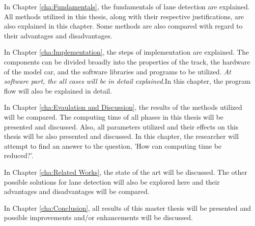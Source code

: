 In Chapter \ref{cha:Fundamentals}, the fundamentals of lane detection are explained. All methods utilized in this thesis, along with their respective justifications, are also explained in this chapter. Some methods are also compared with regard to their advantages and disadvantages.


In Chapter \ref{cha:Implementation}, the steps of implementation are explained. The components can be divided broadly into the properties of the track, the hardware of the model car, and the software libraries and programs to be utilized. \emph{\color{blue}At software part, the all cases will be in detail explained.}In this chapter, the program flow will also be explained in detail.

In Chapter \ref{cha:Evaulation and Discussion}, the results of the methods utilized will be compared. The computing time of all phases in this thesis will be presented and discussed. Also, all parameters utilized and their effects on this thesis will be also presented and discussed. In this chapter, the researcher will attempt to find an answer to the question, 'How can computing time be reduced?'.

In Chapter \ref{cha:Related Works}, the state of the art will be discussed. The other possible solutions for lane detection will also be explored here and their advantages and disadvantages will be compared.

In Chapter \ref{cha:Conclusion}, all results of this master thesis will be presented and possible improvements and/or enhancements will be discussed.


